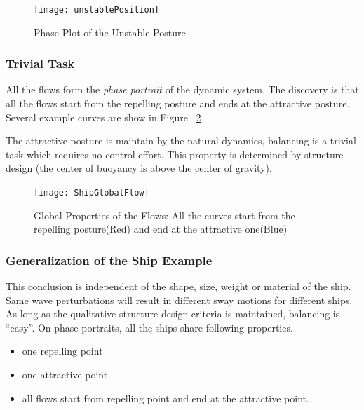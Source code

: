 \begin{figure}[!htbp]
  \begin{center}
      \texttt{[image: unstablePosition]}
    \caption{Phase Plot of the Unstable Posture}
    \label{fig:unStablePosture}
  \end{center}
\end{figure}


\subsubsection*{Trivial Task}
All the flows form the \emph{phase portrait} of the dynamic system. 
The discovery is that all the flows start from the repelling posture and ends at the attractive posture.
Several example curves are show in Figure ~\ref{fig:globalflow}

The attractive posture is maintain by the natural dynamics, balancing  is a  trivial task which requires no control effort.
This property is determined by structure design (the center of buoyancy is above the center of gravity).

\begin{figure}[!htbp]
  \begin{center}
   \texttt{[image: ShipGlobalFlow]}
   \caption{Global Properties of the Flows: All the curves start from the repelling posture(Red) and end at the attractive one(Blue)}
   \label{fig:globalflow}
  \end{center}
\end{figure}

 



\subsubsection*{Generalization of the Ship Example} 
This conclusion is independent of the shape, size, weight or material of the ship. 
Same wave perturbations will result in different sway motions for different ships.
As long as the qualitative structure design criteria is maintained, balancing is ``easy''.
On phase portraits,  all the ships share following properties. 
\begin{itemize}
\item one repelling point 
\item one attractive point 
\item all flows start from repelling point and end at the  attractive point. 
\end{itemize}


